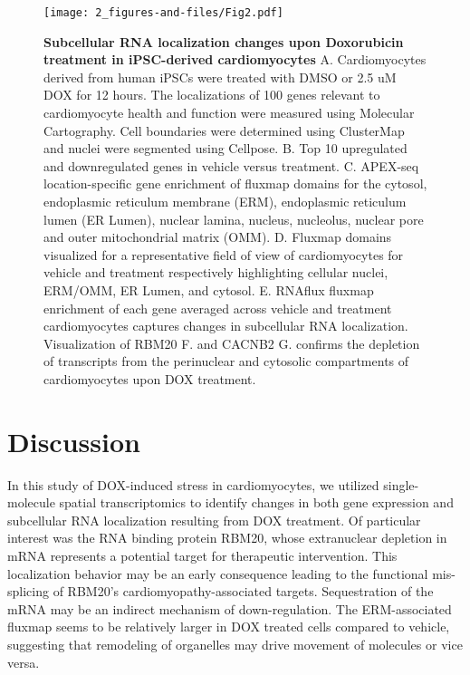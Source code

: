 \begin{figure}[p]
    \centering
    \texttt{[image: 2\_figures-and-files/Fig2.pdf]}
    \caption[Subcellular RNA localization changes upon Doxorubicin treatment in iPSC-derived cardiomyocytes]{\textbf{Subcellular RNA localization changes upon Doxorubicin treatment in iPSC-derived cardiomyocytes} A. Cardiomyocytes derived from human iPSCs were treated with DMSO or 2.5 uM DOX for 12 hours. The localizations of 100 genes relevant to cardiomyocyte health and function were measured using Molecular Cartography. Cell boundaries were determined using ClusterMap and nuclei were segmented using Cellpose. B. Top 10 upregulated and downregulated genes in vehicle versus treatment. C. APEX-seq location-specific gene enrichment of fluxmap domains for the cytosol, endoplasmic reticulum membrane (ERM), endoplasmic reticulum lumen (ER Lumen), nuclear lamina, nucleus, nucleolus, nuclear pore and outer mitochondrial matrix (OMM). D. Fluxmap domains visualized for a representative field of view of cardiomyocytes for vehicle and treatment respectively highlighting cellular nuclei, ERM/OMM, ER Lumen, and cytosol. E. RNAflux fluxmap enrichment of each gene averaged across vehicle and treatment cardiomyocytes captures changes in subcellular RNA localization. Visualization of RBM20 F. and CACNB2 G. confirms the depletion of transcripts from the perinuclear and cytosolic compartments of cardiomyocytes upon DOX treatment.}
    \label{fig:Doxorubicin treatment cardiomyocytes}
\end{figure}

\section{Discussion}

In this study of DOX-induced stress in cardiomyocytes, we utilized single-molecule spatial transcriptomics to identify changes in both gene expression and subcellular RNA localization resulting from DOX treatment. Of particular interest was the RNA binding protein RBM20, whose extranuclear depletion in mRNA represents a potential target for therapeutic intervention. This localization behavior may be an early consequence leading to the functional mis-splicing of RBM20's cardiomyopathy-associated targets. Sequestration of the mRNA may be an indirect mechanism of down-regulation. The ERM-associated fluxmap seems to be relatively larger in DOX treated cells compared to vehicle, suggesting that remodeling of organelles may drive movement of molecules or vice versa. 


